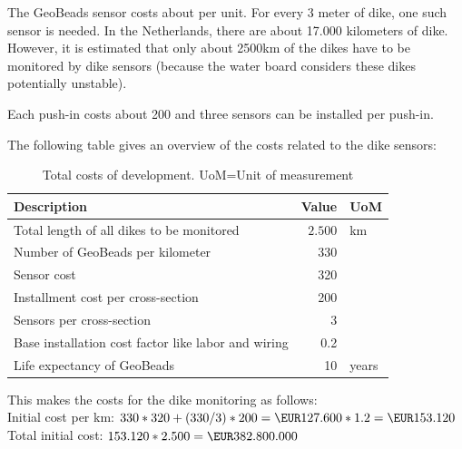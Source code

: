 The GeoBeads sensor costs about  per unit. For every 3 meter of dike, one such sensor is needed. In the Netherlands, there are about 17.000 kilometers of dike. However, it is estimated that only about 2500km of the dikes have to be monitored by dike sensors (because the water board considers these dikes potentially unstable).

Each push-in costs about \EUR{}200 and three sensors can be installed per push-in\cite{TUDelftPHD}. %

The following table gives an overview of the costs related to the dike sensors:

\begin{table}[H]


	\centering
	\begin{tabular}{lrl}
	\toprule
	\textbf{Description} & \multicolumn{1}{l}{\textbf{Value}} & \textbf{UoM} \\ \hline
	Total length of all dikes to be monitored & $2.500$ & km \\
	Number of GeoBeads per kilometer & 330 & \\
	Sensor cost & 320 & \EUR{} \\
	Installment cost per cross-section & 200 &\EUR{} \\
	Sensors per cross-section & 3 & \\
	Base installation cost factor like labor and wiring & 0.2 & \\
	Life expectancy of GeoBeads & 10 & years \\
	\bottomrule
	\end{tabular}
	\label{table:total-dev-costs2} 
	\caption{Total costs of development. UoM=Unit of measurement}
\end{table}

This makes the costs for the dike monitoring as follows: \\
Initial cost per km: $ 330 * 320  +  (330 / 3) * 200 = \EUR127.600 * 1.2 = \EUR153.120$\\
Total initial cost: $ 153.120 * 2.500 = \EUR 382.800.000$

